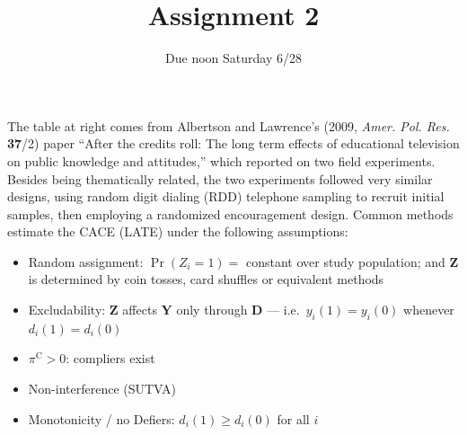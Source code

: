 \documentclass{article}
\title{Assignment 2}
\author{Due noon Saturday 6/28}
\begin{document}
\maketitle

\begin{minipage}{1.0\linewidth}

\begin{figure}
\end{figure}

The table at right comes from Albertson and Lawrence's (2009, \textit{Amer. Pol. Res.} \textbf{37}/2) paper ``After the credits roll: The long term effects of educational television on public knowledge and attitudes,'' which reported on two field experiments. Besides being thematically related, the two experiments followed very similar designs, using random digit dialing (RDD) telephone sampling to recruit initial samples, then employing a randomized encouragement design.  Common methods estimate the CACE (LATE) under the following assumptions:

\begin{itemize}
\item Random assignment: $\Pr(Z_i = 1) = $ constant over study population; and $\bm{Z}$ is determined by coin tosses, card shuffles or equivalent methods
\item Excludability: $\bm{Z}$ affects $\bm{Y}$ only through $\bm{D}$ --- i.e.\ $y_i(1) = y_i(0)$ whenever $d_i(1) = d_i(0)$
\item $\pi^{\textrm{C}} > 0$: compliers exist
\item Non-interference (SUTVA)
\item Monotonicity / no Defiers: $d_i(1) \geq d_i(0)$ for all $i$
\end{itemize}

\end{minipage}
\vspace{2ex}
\end{document}

